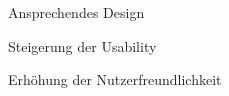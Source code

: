 \begin{frame}
\begin{block}{}
	Ansprechendes Design
\end{block}
\begin{block}{}
	Steigerung der Usability
\end{block}
\begin{block}{}
	Erhöhung der Nutzerfreundlichkeit
\end{block}
\end{frame}